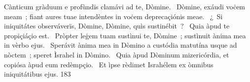 { Cànticum gràduum}
{%
e profùndïs clamávi ad te, Dòmine. 
~Dòmine, exáudi voċem meam~; fiant aures tuae intendèntes in voċem deprecaçiónis meae. 
~¿~Si iniquitátes observáverïs, Dòmine, Dòmine, quìs sustinébit~? 
~Quia àpud te propiçiáçio est. 
~Pròpter leġem tuam sustìnui te, Dòmine~; sustìnuit ànima mea in vèrbo ejus. 
~Sperávit ànima mea in Dòmino a custódia matutína usque ad nòctem~; speret Ìsrahel in Dòmino. 
~Quia àpud Dòminum mizericórdia, et copiósa àpud eum redèmpçio. 
~Et ìpse rèdimet Israhélem ex òmnibus iniquitátibus ejus. 
}
{18}{3}
